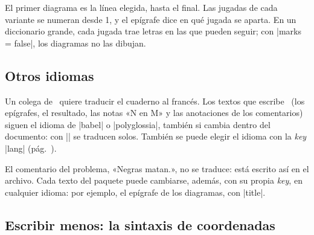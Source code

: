 \begin{goban}
\begin{codeexample}
\end{codeexample}


El primer diagrama es la línea elegida, hasta el final. Las jugadas de cada variante se numeran desde 1, y el epígrafe dice en qué jugada se aparta. En un diccionario grande, cada jugada trae letras en las que pueden seguir; con |marks = false|, los diagramas no las dibujan.

\subsection{Otros idiomas}
\label{tut:idiomas}

Un colega de \karu\ quiere traducir el cuaderno al francés. Los textos que escribe \pgfgoname\ (los epígrafes, el resultado, las notas «N en M» y las anotaciones de los comentarios) siguen el idioma de |babel| o |polyglossia|, también si cambia dentro del documento: con || se traducen solos. También se puede elegir el idioma con la \emph{key} |lang| (pág.~\pageref{subsec:idiomas}).

\begin{codeexample}

\end{codeexample}

\begingroup
{}

\endgroup

El comentario del problema, «Negras matan.», no se traduce: está escrito así en el archivo. Cada texto del paquete puede cambiarse, además, con su propia \emph{key}, en cualquier idioma: por ejemplo, el epígrafe de los diagramas, con |title|.

\begin{codeexample}
\end{codeexample}

\subsection{Escribir menos: la sintaxis de coordenadas}
\label{tut:abreviar}


\end{goban}
